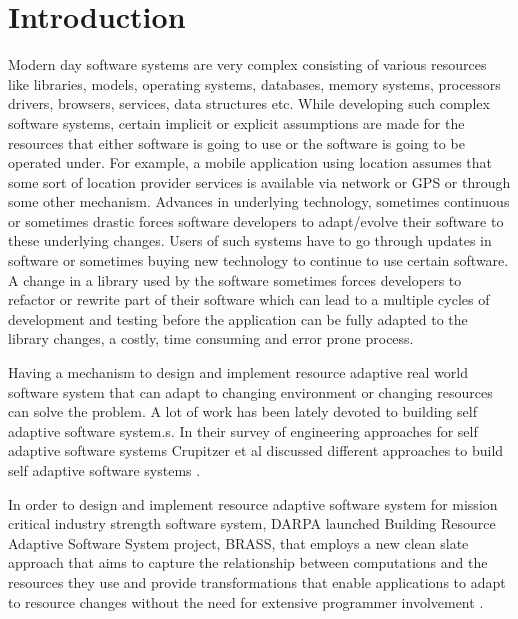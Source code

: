 \section{Introduction}

Modern day software systems are very complex consisting of various resources like libraries, models, operating systems, databases, memory systems, processors drivers, browsers, services, data structures etc. While developing such complex software systems, certain implicit or explicit assumptions are made for the resources that either software is going to use or the software is going to be operated under. For example, a mobile application using location assumes that some sort of location provider services is available via network or GPS or through some other mechanism. Advances in underlying technology, sometimes continuous or sometimes drastic forces software developers to adapt/evolve their software to these underlying changes. Users of such systems have to go through updates in software or sometimes buying new technology to continue to use certain software. A change in a library used by the software sometimes forces developers to refactor or rewrite part of their software which can lead to a multiple cycles of development and testing before the application can be fully adapted to the library changes, a costly, time consuming and error prone process.  

Having a mechanism to design and implement resource adaptive real world software system that can adapt to changing environment or changing resources can solve the problem. A lot of work has been lately devoted to building self adaptive software system.s. In their survey of engineering approaches for self adaptive software systems Crupitzer et al discussed different approaches to build self adaptive software systems \cite{selfAdaptation2}.     

In order to design and implement resource adaptive software system for mission critical industry strength software system, DARPA launched Building Resource Adaptive Software System project, BRASS, that employs a new clean slate approach that aims to capture the relationship between computations and the resources they use and provide transformations that enable applications to adapt to resource changes without the need for extensive programmer involvement \cite{darpa1}. 

